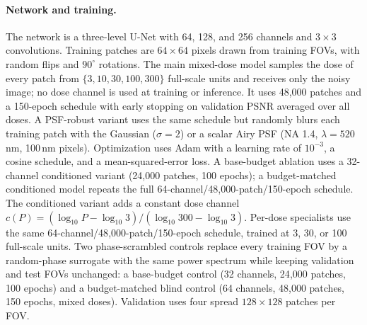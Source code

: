 \documentclass[preprint,12pt]{elsarticle}
\begin{document}
\paragraph{Network and training.}
The network is a three-level U-Net \cite{ronneberger2015unet} with 64, 128, and
256 channels and $3\times3$ convolutions. Training patches are $64\times64$
pixels drawn from training FOVs, with random flips and $90^\circ$ rotations.
The main mixed-dose model samples the dose of every patch from
$\{3,10,30,100,300\}$ full-scale units and receives only the noisy image; no
dose channel is used at training or inference. It uses 48{,}000 patches and a
150-epoch schedule with early stopping on validation PSNR averaged over all
doses. A PSF-robust variant uses the same schedule but randomly blurs each
training patch with the Gaussian ($\sigma=2$) or a scalar Airy PSF (NA 1.4,
$\lambda=520$\,nm, 100\,nm pixels). Optimization
uses Adam with a learning rate of $10^{-3}$, a cosine schedule, and a
mean-squared-error loss. A base-budget ablation uses a 32-channel
conditioned variant (24{,}000 patches, 100 epochs); a budget-matched
conditioned model repeats the full 64-channel/48{,}000-patch/150-epoch
schedule. The conditioned variant adds a constant dose channel
$c(P)=(\log_{10}P-\log_{10}3)/(\log_{10}300-\log_{10}3)$. Per-dose specialists
use the same 64-channel/48{,}000-patch/150-epoch schedule, trained at 3, 30, or
100 full-scale units. Two phase-scrambled controls replace every training FOV by a
random-phase surrogate with the same power spectrum while keeping validation
and test FOVs unchanged: a base-budget control (32 channels, 24{,}000 patches,
100 epochs) and a budget-matched blind control (64 channels, 48{,}000 patches,
150 epochs, mixed doses). Validation uses four spread $128\times128$ patches
per FOV.
\end{document}

